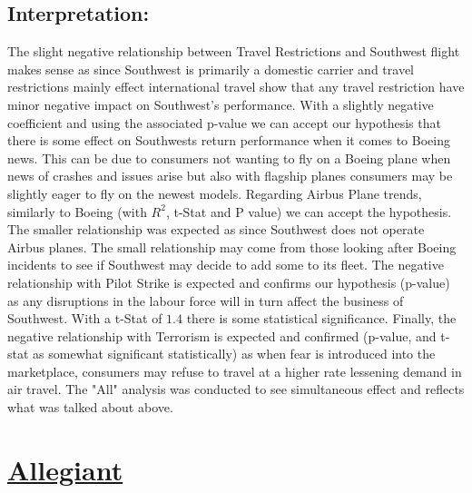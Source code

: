 \documentclass[12pt]{report}
\begin{document}
\subsection*{Interpretation:}
The slight negative relationship between Travel Restrictions and Southwest flight makes sense as since Southwest is primarily a domestic carrier and travel restrictions mainly effect international travel show that any travel restriction have minor negative impact on Southwest's performance.
With a slightly negative coefficient and using the associated p-value we can accept our hypothesis that there is some effect on Southwests return performance when it comes to Boeing news.
This can be due to consumers not wanting to fly on a Boeing plane when news of crashes and issues arise but also with flagship planes consumers may be slightly eager to fly on the newest models.
Regarding Airbus Plane trends, similarly to Boeing (with $R^2$, t-Stat and P value) we can accept the hypothesis. The smaller relationship was expected as since Southwest does not operate Airbus planes.
The small relationship may come from those looking after Boeing incidents to see if Southwest may decide to add some to its fleet.
The negative relationship with Pilot Strike is expected and confirms our hypothesis (p-value) as any disruptions in the labour force will in turn affect the business of Southwest. With a t-Stat of $1.4$ there is some statistical significance.
Finally, the negative relationship with Terrorism is expected and confirmed (p-value, and t-stat as somewhat significant statistically) as when fear is introduced into the marketplace, consumers may refuse to travel at a higher rate lessening demand in air travel.
The "All" analysis was conducted to see simultaneous effect and reflects what was talked about above.

\newpage
\section*{\underline{Allegiant}}
\end{document}

